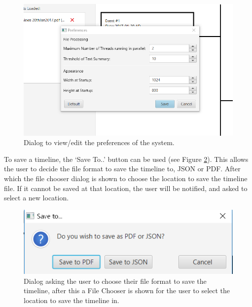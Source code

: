 \begin{figure}[H]
\caption{Dialog to view/edit the preferences of the system.}
\label{fig:preferences}
\includegraphics{preferences.PNG}
\centering
\end{figure}

\par To save a timeline, the `Save To..' button can be used (see Figure \ref{fig:saveTo}). This allows the user to decide the file format to save the timeline to, JSON or PDF. After which the file chooser dialog is shown to choose the location to save the timeline file. If it cannot be saved at that location, the user will be notified, and asked to select a new location.

\begin{figure}[H]
\caption{Dialog asking the user to choose their file format to save the timeline, after this a File Chooser is shown for the user to select the location to save the timeline in.}
\label{fig:saveTo}
\includegraphics{saveTo.PNG}
\centering
\end{figure}